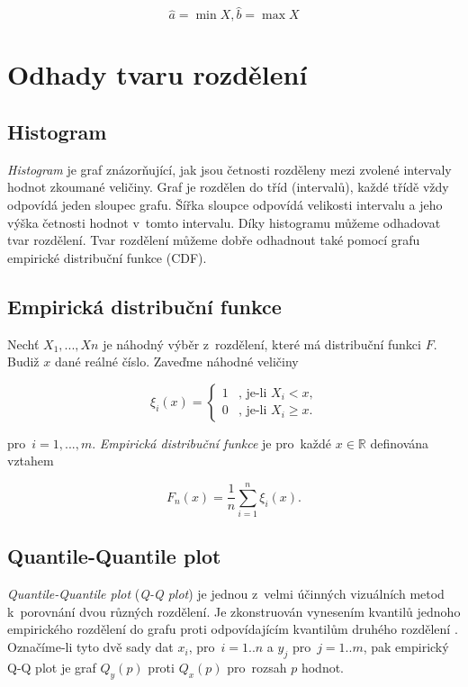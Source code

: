 \documentclass[thesis=B,czech]{FITthesis}[2012/06/26]
\begin{document}
$$\hat{a}=\min{X}, \hat{b}=\max{X}$$



\section{Odhady tvaru rozdělení}

\subsection{Histogram}
\textit{Histogram} je graf znázorňující, jak jsou četnosti rozděleny mezi zvolené intervaly hodnot zkoumané veličiny. Graf je rozdělen do tříd (intervalů), každé třídě vždy odpovídá jeden sloupec grafu. Šířka sloupce odpovídá velikosti intervalu a jeho výška četnosti hodnot v~tomto intervalu. Díky histogramu můžeme odhadovat tvar rozdělení. Tvar rozdělení můžeme dobře odhadnout také pomocí grafu empirické distribuční funkce (CDF).

\subsection{Empirická distribuční funkce}
Nechť $X_{1},...,X{n}$ je náhodný výběr z~rozdělení, které má distribuční funkci $F$. Budiž $x$ dané reálné číslo. Zaveďme náhodné veličiny

$$
\xi_{i}(x) = \left\{ \begin{array}{rl}
1 &\mbox{, je-li $X_{i}<x$,} \\
0 &\mbox{, je-li $X_{i}\geq x$.}
\end{array} \right.
$$

\noindent pro~$i=1,...,m$. \textit{Empirická distribuční funkce} je pro~každé $x \in \mathbb{R}$ definována vztahem

$$F_{n}(x)=\frac{1}{n}\sum^{n}_{i=1}\xi_{i}(x).$$


\subsection{Quantile-Quantile plot}
\textit{Quantile-Quantile plot} (\textit{Q-Q plot}) je jednou z~velmi účinných vizuálních metod k~porovnání dvou různých rozdělení. Je zkonstruován vynesením kvantilů jednoho empirického rozdělení do grafu proti odpovídajícím kvantilům druhého rozdělení \cite[p.193-203]{GraphMethods}. Označíme-li tyto dvě sady dat $x_{i}$, pro~$i=1..n$ a $y_{j}$ pro~$j=1..m$, pak empirický Q-Q plot je graf $Q_{y}(p)$ proti $Q_{x}(p)$ pro~rozsah $p$ hodnot. 
\end{document}
